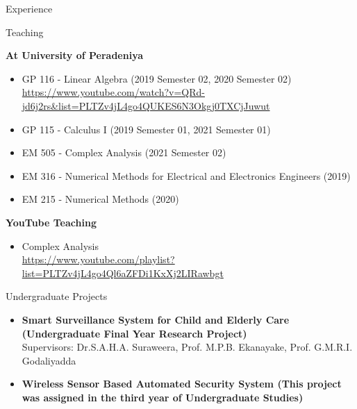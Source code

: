 \documentclass{resume} %
\begin{document}
\begin{rSection}{Experience}
\begin{rSection}{Teaching}
\medskip

\textbf{At University of Peradeniya}
\begin{itemize}
    \item GP 116 - Linear Algebra (2019 Semester 02, 2020 Semester 02)
    \newline \url{https://www.youtube.com/watch?v=QRd-jd6j2rs&list=PLTZv4jL4go4QUKES6N3Okgj0TXCjJuwut}
    \item GP 115 - Calculus I (2019 Semester 01, 2021 Semester 01)
    \item EM 505 - Complex Analysis (2021 Semester 02)
    \item EM 316 - Numerical Methods for Electrical and Electronics Engineers (2019)
    \item EM 215 - Numerical Methods (2020)
\end{itemize}
\medskip

\textbf{YouTube Teaching}
\begin{itemize}
    \item Complex Analysis\\
\url{https://www.youtube.com/playlist?list=PLTZv4jL4go4Ql6aZFDi1KxXj2LIRawbgt}
\end{itemize}
\end{rSection}

\medskip



\end{rSection}




\begin{rSection}{Undergraduate Projects}

\begin{itemize}
    \item \textbf{Smart Surveillance System for Child and Elderly Care (Undergraduate Final Year Research Project)}
    \\Supervisors: Dr.S.A.H.A. Suraweera, Prof. M.P.B. Ekanayake, Prof. G.M.R.I. Godaliyadda
    \item \textbf{Wireless Sensor Based Automated Security System (This project was assigned in the third year of Undergraduate Studies)}
    
\end{itemize}
    
\end{rSection}
\end{document}
